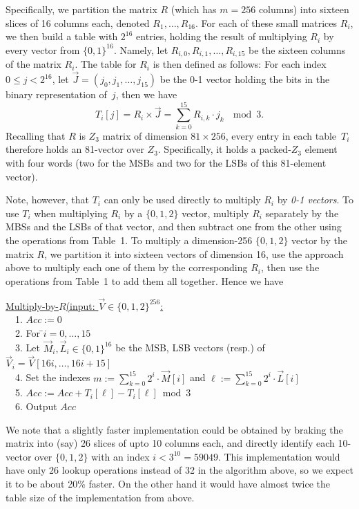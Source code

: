 Specifically, we partition the matrix $R$ (which has $m=256$ columns) into sixteen slices of 16 columns each, denoted $R_1,\ldots,R_{16}$.
For each of these small matrices $R_i$, we then build a table with $2^{16}$ entries, holding the result of multiplying $R_i$ by every vector from $\{0,1\}^{16}$.
Namely, let $R_{i,0},R_{i,1},\ldots,R_{i,15}$ be the sixteen columns of the matrix $R_i$.
The table for $R_i$ is then defined as follows: For each index $0\le j < 2^{16}$, let $\vec{J}=(j_0,j_1,\ldots,j_{15})$ be the 0-1 vector holding the bits in the binary representation of~$j$, then we have
\[
T_i[j] = R_i \times \vec{J} = \sum_{k=0}^{15} R_{i,k} \cdot j_k ~~\bmod 3.
\]
Recalling that $R$ is $Z_3$ matrix of dimension $81\times 256$, every entry in each table~$T_i$ therefore holds an 81-vector over $Z_3$.
Specifically, it holds a packed-$Z_3$ element with four words (two for the MSBs and two for the LSBs of this 81-element vector).

Note, however, that $T_i$ can only be used directly to multiply $R_i$ by \emph{0-1 vectors}.
To use $T_i$ when multiplying $R_i$ by a $\{0,1,2\}$ vector, multiply $R_i$ separately by the MBSs and the LSBs of that vector, and then subtract one from the other using the operations from Table~1.
To multiply a dimension-256 $\{0,1,2\}$ vector by the matrix $R$, we partition it into sixteen vectors of dimension 16, use the approach above to multiply each one of them by the corresponding $R_i$, then use the operations from Table~1 to add them all together.
Hence we have

\begin{tabbing}
	\underline{Multiply-by-$R$(input: $\vec{V}\in\{0,1,2\}^{256}$:}\\
	~~1. $Acc := 0$\\
	~~2. For \=$i=0,\ldots,15$\\
	~~3. \> Let $\vec{M}_i,\vec{L}_i\in\{0,1\}^{16}$ be the MSB, LSB vectors (resp.) of $\vec{V}_i=\vec{V}[16i,\ldots,16i+15]$\\
	~~4. \> Set the indexes $m:=\sum_{k=0}^{15}2^i\cdot\vec{M}[i]$
	and $\ell:=\sum_{k=0}^{15}2^i\cdot\vec{L}[i]$\\
	~~5. \> $Acc := Acc + T_i[\ell] - T_i[\ell] \bmod 3$\\
	~~6. Output $Acc$
\end{tabbing}

We note that a slightly faster implementation could be obtained by braking the matrix into (say) 26 slices of upto 10 columns each, and directly identify each 10-vector over $\{0,1,2\}$ with an index $i<3^{10}=59049$.
This implementation would have only 26 lookup operations instead of 32 in the algorithm above, so we expect it to be about 20\% faster. On the other hand it would have almost twice the table size of the implementation from above.


